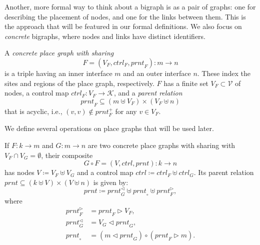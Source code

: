 \documentclass[runningheads]{llncs}
\newcommand\ctrl{\mathit{ctrl}}
\newcommand\prnt{\mathit{prnt}}
\begin{document}
Another, more formal way to think about a bigraph is as a pair of graphs: one
for describing the placement of nodes, and one for the links between them. This
is the approach that will be featured in our formal definitions. We also focus
on \emph{concrete} bigraphs, where nodes and links have distinct identifiers.

\begin{definition}
  A \emph{concrete place graph with sharing}
  \[ F = (V_F, \ctrl_F, \prnt_F) : m \to n \]
  is a triple having an inner interface $m$ and an outer interface $n$. These
  index the sites and regions of the place graph, respectively. $F$ has a finite
  set $V_F \subset \mathcal{V}$ of nodes, a control map $\ctrl_F : V_F \to
  \mathcal{K}$, and a \emph{parent relation}
  \[ \prnt_F \subseteq (m \uplus V_F) \times (V_F \uplus n) \]
  that is acyclic, i.e., $(v, v) \not\in \prnt_F^+$ for any $v \in V_F$.
\end{definition}

We define several operations on place graphs that will be used later.

\begin{definition}
  If $F : k \to m$ and $G : m \to n$ are two concrete place graphs with sharing
  with $V_F \cap V_G = \emptyset$, their composite
  \[ G \circ F = (V, \ctrl, \prnt) : k \to n \]
  has nodes $V \coloneqq V_F \uplus V_G$ and a control map $\ctrl \coloneqq
  \ctrl_F \uplus \ctrl_G$. Its parent relation $\prnt \subseteq (k \uplus V)
  \times (V \uplus n)$ is given by:
  \[ \prnt \coloneqq \prnt_G^\lhd \uplus \prnt_\circ \uplus \prnt_F^\rhd, \]
  where
  \begin{align*}
    \prnt_F^\rhd &= \prnt_F \rhd V_F, \\
    \prnt_G^\lhd &= V_G \lhd \prnt_G, \\
    \prnt_\circ &= (m \lhd \prnt_G) \circ (\prnt_F \rhd m).
  \end{align*}
\end{definition}
\end{document}
